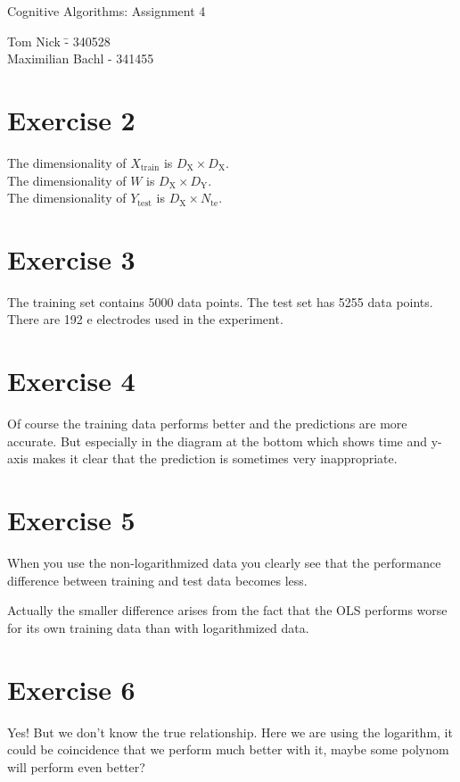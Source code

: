 \documentclass[a4paper,10pt]{article}
\begin{document}
\begin{center}
\Large{Cognitive Algorithms: Assignment 4} \\
\end{center}
\begin{tabbing}
Tom Nick \hspace{2cm}\= - 340528\\
Maximilian Bachl \> - 341455 \\
\end{tabbing}

\section*{Exercise 2}

The dimensionality of $X_\textrm{train}$ is $D_\textrm{X} \times D_\textrm{X}$.\\
The dimensionality of $W$ is $D_\textrm{X} \times D_\textrm{Y}$.\\
The dimensionality of $Y_\textrm{test}$ is $D_\textrm{X} \times N_\textrm{te}$.

\section*{Exercise 3}

The training set contains 5000 data points. The test set has 5255 data points. There are 192 e
electrodes used in the experiment.

\section*{Exercise 4}

Of course the training data performs better and the predictions are more accurate. But especially in the diagram at the bottom which shows time and y-axis makes it clear that the prediction is sometimes very inappropriate.

\section*{Exercise 5}

When you use the non-logarithmized data you clearly see that the performance difference between training and test data becomes less.

Actually the smaller difference arises from the fact that the OLS performs worse for its own training data than with logarithmized data.

\section*{Exercise 6}

Yes! But we don't know the true relationship.
Here we are using the logarithm, it could be coincidence that we perform much better with it, maybe some polynom will perform even better?
\end{document}
